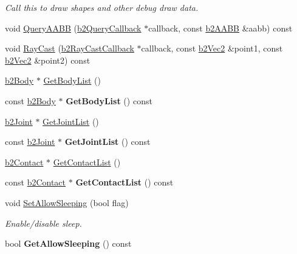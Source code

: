 \begin{DoxyCompactItemize}
\begin{DoxyCompactList}\small\item\em Call this to draw shapes and other debug draw data. \end{DoxyCompactList}\item 
void \hyperlink{classb2_world_a711e55d2c6e68400f93472f807c3775b}{Query\-A\-A\-B\-B} (\hyperlink{classb2_query_callback}{b2\-Query\-Callback} $\ast$callback, const \hyperlink{structb2_a_a_b_b}{b2\-A\-A\-B\-B} \&aabb) const 
\item 
void \hyperlink{classb2_world_ad902548be84df9cc36eced0f4c89ab0a}{Ray\-Cast} (\hyperlink{classb2_ray_cast_callback}{b2\-Ray\-Cast\-Callback} $\ast$callback, const \hyperlink{structb2_vec2}{b2\-Vec2} \&point1, const \hyperlink{structb2_vec2}{b2\-Vec2} \&point2) const 
\item 
\hyperlink{classb2_body}{b2\-Body} $\ast$ \hyperlink{classb2_world_a1b87c03955e3312d308ddf679adf3c85}{Get\-Body\-List} ()
\item 
\hypertarget{classb2_world_ab7c43e574c60203db003645153663266}{const \hyperlink{classb2_body}{b2\-Body} $\ast$ {\bfseries Get\-Body\-List} () const }\label{classb2_world_ab7c43e574c60203db003645153663266}

\item 
\hyperlink{classb2_joint}{b2\-Joint} $\ast$ \hyperlink{classb2_world_a55db7240f8290aa02cab79f181934de8}{Get\-Joint\-List} ()
\item 
\hypertarget{classb2_world_a966ceb42d968a8a544d60826ce0ed925}{const \hyperlink{classb2_joint}{b2\-Joint} $\ast$ {\bfseries Get\-Joint\-List} () const }\label{classb2_world_a966ceb42d968a8a544d60826ce0ed925}

\item 
\hyperlink{classb2_contact}{b2\-Contact} $\ast$ \hyperlink{classb2_world_ab1e1c59fd7534c0268c2a3e31370a425}{Get\-Contact\-List} ()
\item 
\hypertarget{classb2_world_a15e9281350c0494954197801372e3dbb}{const \hyperlink{classb2_contact}{b2\-Contact} $\ast$ {\bfseries Get\-Contact\-List} () const }\label{classb2_world_a15e9281350c0494954197801372e3dbb}

\item 
\hypertarget{classb2_world_a6755872564fc3db70c69d2b9d349fa33}{void \hyperlink{classb2_world_a6755872564fc3db70c69d2b9d349fa33}{Set\-Allow\-Sleeping} (bool flag)}\label{classb2_world_a6755872564fc3db70c69d2b9d349fa33}

\begin{DoxyCompactList}\small\item\em Enable/disable sleep. \end{DoxyCompactList}\item 
\hypertarget{classb2_world_aaf98b836840452d646927ba19a02316f}{bool {\bfseries Get\-Allow\-Sleeping} () const }\label{classb2_world_aaf98b836840452d646927ba19a02316f}


\end{DoxyCompactItemize}
